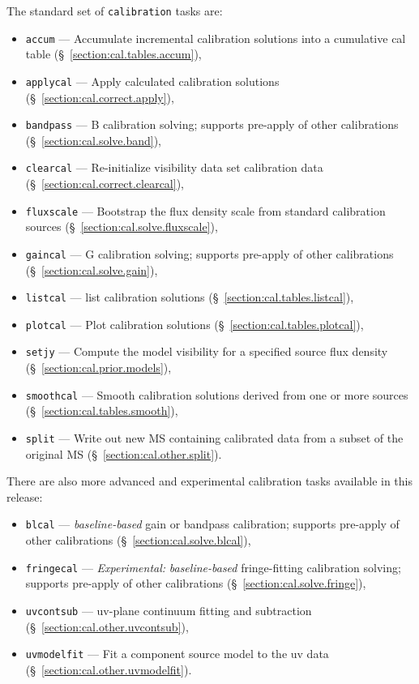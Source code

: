The standard set of {\tt calibration} tasks are:
\begin{itemize}
   \item {\tt accum} --- Accumulate incremental calibration solutions
      into a cumulative cal table (\S~\ref{section:cal.tables.accum}),
   \item {\tt applycal} --- Apply calculated calibration solutions
      (\S~\ref{section:cal.correct.apply}),
   \item {\tt bandpass} --- B calibration solving; supports pre-apply
      of other calibrations (\S~\ref{section:cal.solve.band}),
   \item {\tt clearcal} --- Re-initialize visibility data set
     calibration data (\S~\ref{section:cal.correct.clearcal}),
   \item {\tt fluxscale} --- Bootstrap the flux density scale from
      standard calibration sources (\S~\ref{section:cal.solve.fluxscale}), 
   \item {\tt gaincal} --- G calibration solving; supports pre-apply
      of other calibrations (\S~\ref{section:cal.solve.gain}),
   \item {\tt listcal} --- list calibration solutions 
      (\S~\ref{section:cal.tables.listcal}),
   \item {\tt plotcal} --- Plot calibration solutions 
      (\S~\ref{section:cal.tables.plotcal}),
   \item {\tt setjy} --- Compute the model visibility for a specified
      source flux density (\S~\ref{section:cal.prior.models}),
   \item {\tt smoothcal} --- Smooth calibration solutions derived from
      one or more sources (\S~\ref{section:cal.tables.smooth}),
   \item {\tt split} --- Write out new MS containing calibrated data
      from a subset of the original MS (\S~\ref{section:cal.other.split}).
\end{itemize}

There are also more advanced and experimental calibration tasks 
available in this release:
\begin{itemize}
   \item {\tt blcal} --- {\it baseline-based} gain or bandpass
      calibration; supports  pre-apply of other calibrations 
      (\S~\ref{section:cal.solve.blcal}),
   \item {\tt fringecal} --- {\it Experimental:} 
      {\it baseline-based} fringe-fitting calibration 
      solving; supports pre-apply of other calibrations 
      (\S~\ref{section:cal.solve.fringe}),
   \item {\tt uvcontsub} --- uv-plane continuum fitting and subtraction 
      (\S~\ref{section:cal.other.uvcontsub}),
   \item {\tt uvmodelfit} --- Fit a component source model to
     the uv data (\S~\ref{section:cal.other.uvmodelfit}).
\end{itemize}


